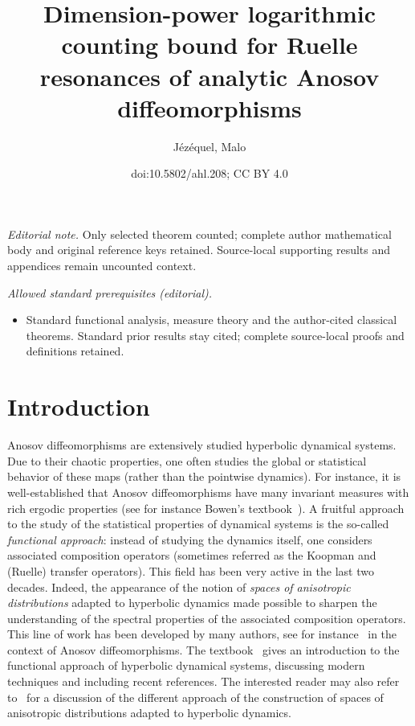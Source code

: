 \documentclass[10pt]{amsart}
\title{Dimension-power logarithmic counting bound for Ruelle resonances of analytic Anosov diffeomorphisms}
\author{Jézéquel, Malo}
\date{doi:10.5802/ahl.208; CC BY 4.0}
\theoremstyle{definition}\newtheorem{defi}[theo]{Definition}\newtheorem{rema}[theo]{Remark}\newtheorem{exam}[theo]{Example}\newtheorem{exem}[theo]{Example}\newtheorem{nota}[theo]{Notation}
\begin{document}
\maketitle
\noindent\textit{Editorial note.} Only selected theorem counted; complete author mathematical body and original reference keys retained. Source-local supporting results and appendices remain uncounted context.\par\medskip
\noindent\textit{Allowed standard prerequisites (editorial).}\begin{itemize}
\item Standard functional analysis, measure theory and the author-cited classical theorems. Standard prior results stay cited; complete source-local proofs and definitions retained.
\end{itemize}\medskip

\section{Introduction}

Anosov diffeomorphisms are extensively studied hyperbolic dynamical systems. Due to their chaotic properties, one often studies the global or statistical behavior of these maps (rather than the pointwise dynamics). For instance, it is well-established that Anosov diffeomorphisms have many invariant measures with rich ergodic properties (see for instance Bowen's textbook~\cite{bowen_book}). A fruitful approach to the study of the statistical properties of dynamical systems is the so-called \emph{functional approach}: instead of studying the dynamics itself, one considers associated composition operators (sometimes referred as the Koopman and (Ruelle) transfer operators). This field has been very active in the last two decades. Indeed, the appearance of the notion of \emph{spaces of anisotropic distributions} adapted to hyperbolic dynamics made possible to sharpen the understanding of the spectral properties of the associated composition operators. This line of work has been developed by many authors, see for instance~\cite{blank_keller_liverani, baladi_tsujii, baladi_tsujii_determinant, faure_roy_sjostrand,
gouezel_liverani_1, gouezel_liverani_2} in the context of Anosov diffeomorphisms. The textbook~\cite{baladi_book} gives an introduction to the functional approach of hyperbolic dynamical systems, discussing modern techniques and including recent references. The interested reader may also refer to~\cite{baladi_quest} for a discussion of the different approach of the construction of spaces of anisotropic distributions adapted to hyperbolic dynamics.
\end{document}
